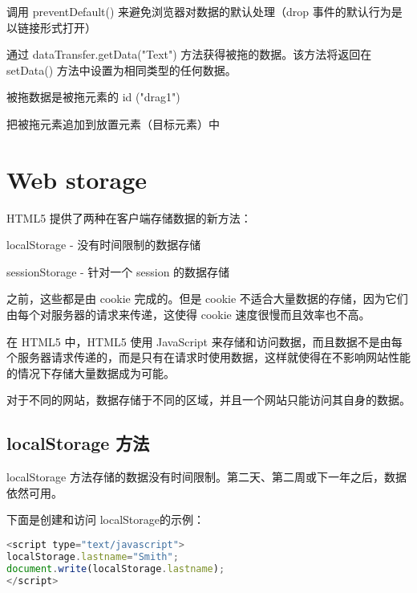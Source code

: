 \begin{compactitem}
\item 调用 preventDefault() 来避免浏览器对数据的默认处理（drop 事件的默认行为是以链接形式打开）
\item 通过 dataTransfer.getData("Text") 方法获得被拖的数据。该方法将返回在 setData() 方法中设置为相同类型的任何数据。
\item 被拖数据是被拖元素的 id ("drag1")
\item 把被拖元素追加到放置元素（目标元素）中
\end{compactitem}







\section{Web storage}




	






HTML5 提供了两种在客户端存储数据的新方法：

\begin{compactitem}
\item localStorage - 没有时间限制的数据存储
\item sessionStorage - 针对一个 session 的数据存储
\end{compactitem}


之前，这些都是由 cookie 完成的。但是 cookie 不适合大量数据的存储，因为它们由每个对服务器的请求来传递，这使得 cookie 速度很慢而且效率也不高。

在 HTML5 中，HTML5 使用 JavaScript 来存储和访问数据，而且数据不是由每个服务器请求传递的，而是只有在请求时使用数据，这样就使得在不影响网站性能的情况下存储大量数据成为可能。

对于不同的网站，数据存储于不同的区域，并且一个网站只能访问其自身的数据。

\subsection{localStorage 方法}

localStorage 方法存储的数据没有时间限制。第二天、第二周或下一年之后，数据依然可用。

下面是创建和访问 localStorage的示例：



\begin{lstlisting}[language=JavaScript]
<script type="text/javascript">
localStorage.lastname="Smith";
document.write(localStorage.lastname);
</script>
\end{lstlisting}

